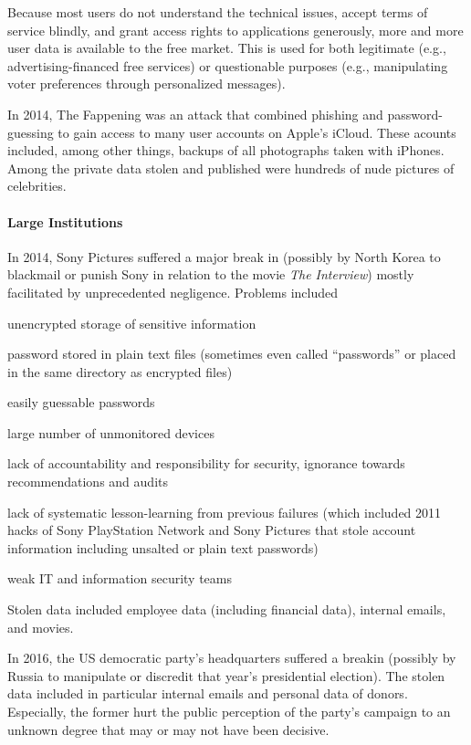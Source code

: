 Because most users do not understand the technical issues, accept terms of service blindly, and grant access rights to applications generously, more and more user data is available to the free market.
This is used for both legitimate (e.g., advertising-financed free services) or questionable purposes (e.g., manipulating voter preferences through personalized messages).

In 2014, The Fappening was an attack that combined phishing and password-guessing to gain access to many user accounts on Apple's iCloud.
These acounts included, among other things, backups of all photographs taken with iPhones.
Among the private data stolen and published were hundreds of nude pictures of celebrities.

\paragraph{Large Institutions}
In 2014, Sony Pictures suffered a major break in (possibly by North Korea to blackmail or punish Sony in relation to the movie \emph{The Interview}) mostly facilitated by unprecedented negligence.
Problems included
\begin{compactitem}
 \item unencrypted storage of sensitive information
 \item password stored in plain text files (sometimes even called ``passwords'' or placed in the same directory as encrypted files)
 \item easily guessable passwords
 \item large number of unmonitored devices
 \item lack of accountability and responsibility for security, ignorance towards recommendations and audits
 \item lack of systematic lesson-learning from previous failures (which included 2011 hacks of Sony PlayStation Network and Sony Pictures that stole account information including unsalted or plain text passwords)
 \item weak IT and information security teams
\end{compactitem}
Stolen data included employee data (including financial data), internal emails, and movies.

In 2016, the US democratic party's headquarters suffered a breakin (possibly by Russia to manipulate or discredit that year's presidential election).
The stolen data included in particular internal emails and personal data of donors.
Especially, the former hurt the public perception of the party's campaign to an unknown degree that may or may not have been decisive.

